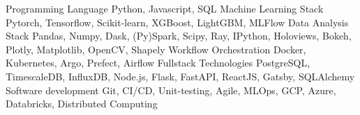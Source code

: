 \begin{cvskills}
  \cvskill
    {Programming Language}   
    {Python, Javascript, SQL}
  \cvskill
    {Machine Learning Stack}   
    {Pytorch, Tensorflow, Scikit-learn, XGBoost, LightGBM, MLFlow}
  \cvskill
    {Data Analysis Stack}   
    {Pandas, Numpy, Dask, (Py)Spark, Scipy, Ray, IPython, Holoviews, Bokeh, Plotly, Matplotlib, OpenCV, Shapely}
  \cvskill
    {Workflow Orchestration}
    {Docker, Kubernetes, Argo, Prefect, Airflow}
  \cvskill
    {Fullstack Technologies}   
    {PostgreSQL, TimescaleDB, InfluxDB, Node.js, Flask, FastAPI, ReactJS, Gatsby, SQLAlchemy}
  \cvskill
    {Software development} 
    {Git, CI/CD, Unit-testing, Agile, MLOps, GCP, Azure, Databricks, Distributed Computing}
\end{cvskills}
